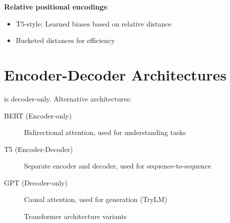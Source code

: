 \textbf{Relative positional encodings}:
\begin{itemize}
    \item T5-style: Learned biases based on relative distance
    \item Bucketed distances for efficiency
\end{itemize}

\section{Encoder-Decoder Architectures}

\TryLM is decoder-only. Alternative architectures:

\begin{description}
    \item[BERT (Encoder-only)] Bidirectional attention, used for understanding tasks
    \item[T5 (Encoder-Decoder)] Separate encoder and decoder, used for sequence-to-sequence
    \item[GPT (Decoder-only)] Causal attention, used for generation (TryLM)
\end{description}

\begin{figure}[H]
\centering
{}
\caption{Transformer architecture variants}
\end{figure}

